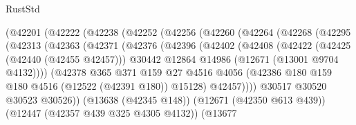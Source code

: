 \begin{lexlean}{RustStd}
\begin{coremodule}
                        (@42201
                          (@42222
                            (@42238
                              (@42252
                                (@42256
                                  (@42260
                                    (@42264
                                      (@42268
                                        (@42295
                                          (@42313
                                            (@42363
                                              (@42371
                                                (@42376
                                                  (@42396
                                                    (@42402
                                                      (@42408
                                                        (@42422
                                                          (@42425 (@42440 (@42455 @42457)))
                                                          @30442
                                                          @12864
                                                          @14986
                                                          (@12671 (@13001 @9704 @4132))))
                                                      (@42378
                                                        @365
                                                        @371
                                                        @159
                                                        @27
                                                        @4516
                                                        @4056
                                                        (@42386
                                                          @180
                                                          @159
                                                          @180
                                                          @4516
                                                          (@12522 (@42391 @180))
                                                          @15128)
                                                        @42457))))
                                                @30517
                                                @30520
                                                @30523
                                                @30526))
                                            (@13638 (@42345 @148))
                                            (@12671 (@42350 @613 @439))
                                            (@12447 (@42357 @439 @325 @4305 @4132))
                                            (@13677

\end{coremodule}
\end{lexlean}
